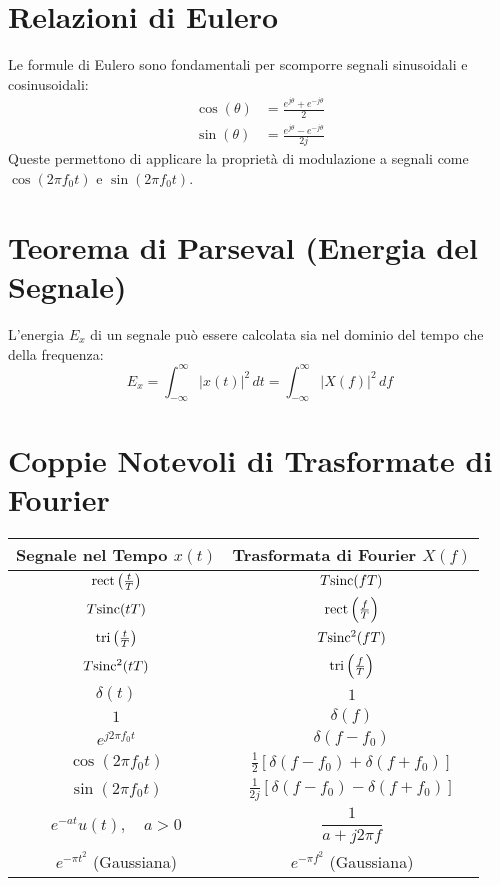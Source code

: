\section{Relazioni di Eulero}
Le formule di Eulero sono fondamentali per scomporre segnali sinusoidali e cosinusoidali:
\begin{align*}
    \cos(\theta) &= \frac{e^{j\theta} + e^{-j\theta}}{2} \\
    \sin(\theta) &= \frac{e^{j\theta} - e^{-j\theta}}{2j}
\end{align*}
Queste permettono di applicare la proprietà di modulazione a segnali come $\cos(2\pi f_0 t)$ e $\sin(2\pi f_0 t)$.

\section{Teorema di Parseval (Energia del Segnale)}
L'energia $E_x$ di un segnale può essere calcolata sia nel dominio del tempo che della frequenza:
\begin{equation*}
    E_x = \int_{-\infty}^{\infty} |x(t)|^2 \,dt = \int_{-\infty}^{\infty} |X(f)|^2 \,df
\end{equation*}

\section{Coppie Notevoli di Trasformate di Fourier}

\begin{center}
\begin{tabular}{c c}
    \toprule
    \textbf{Segnale nel Tempo $x(t)$} & \textbf{Trasformata di Fourier $X(f)$} \\
    \midrule
    $\text{rect}\left(\frac{t}{T}\right)$ & $T \text{sinc}(fT)$ \\
    \addlinespace
    $T \text{sinc}(tT)$ & $\text{rect}\left(\frac{f}{T}\right)$ \\
    \addlinespace
    $\text{tri}\left(\frac{t}{T}\right)$ & $T \text{sinc}^2(fT)$ \\
    \addlinespace
    $T \text{sinc}^2(tT)$ & $\text{tri}\left(\frac{f}{T}\right)$ \\
    \addlinespace
    $\delta(t)$ & $1$ \\
    \addlinespace
    $1$ & $\delta(f)$ \\
    \addlinespace
    $e^{j2\pi f_0 t}$ & $\delta(f - f_0)$ \\
    \addlinespace
    $\cos(2\pi f_0 t)$ & $\frac{1}{2}\left[\delta(f - f_0) + \delta(f + f_0)\right]$ \\
    \addlinespace
    $\sin(2\pi f_0 t)$ & $\frac{1}{2j}\left[\delta(f - f_0) - \delta(f + f_0)\right]$ \\
    \addlinespace
    $e^{-at} u(t), \quad a>0$ & $\dfrac{1}{a + j2\pi f}$ \\
    \addlinespace
    $e^{-\pi t^2}$ (Gaussiana) & $e^{-\pi f^2}$ (Gaussiana) \\
    \bottomrule
\end{tabular}
\end{center}

